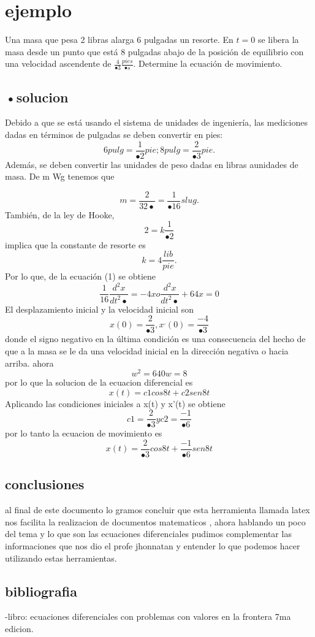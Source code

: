 \documentclass[12pt]{book}
\begin{document}
\section{ejemplo}
Una masa que pesa 2 libras alarga 6 pulgadas un resorte. En $t = 0$ se libera la masa desde un punto que está 8 pulgadas abajo de la posición de equilibrio con una velocidad ascendente de $\frac{4}{•3} \frac{pies}{•s}$. Determine la ecuación de movimiento.

\subsection{•solucion} 
 Debido a que se está usando el sistema de unidades de ingeniería, las mediciones dadas en términos de pulgadas se deben convertir en pies:
\[ 6 pulg = \frac{1}{•2} pie ; 8 pulg =  \frac{2}{•3} pie.
 \]
 Además, se deben convertir las unidades de peso dadas en libras aunidades de masa.
  De m  Wg tenemos que 
  
 \[ m= \frac{2}{32•} =\frac{1}{•16} slug.
  \] 
   También, de la ley de Hooke,
   \[ 2= k \frac{1}{•2} 
   \] implica que la constante de resorte es \[k = 4 \frac{lib}{pie}.
   \] Por lo que, de la ecuación (1) se obtiene
  \[ \frac{1}{16} \frac{d^{2}x}{dt^{2}•}= -4x o \frac{d^{2}x}{dt^{2}•} + 64x = 0
  \]
El desplazamiento inicial y la velocidad inicial son
\[ x(0)=\frac{2}{•3},x^{,}(0)=\frac{-4}{•3} 
  \]donde el signo negativo en la última condición es una consecuencia del hecho de que a la masa 
se le da una velocidad inicial en la dirección negativa o hacia arriba.
ahora
 \[ w^{2}= 64 0  w= 8
 \]
  por lo que la solucion de la ecuacion diferencial es 
\[x(t)= c1 cos8t + c2 sen8t   
\]
Aplicando las condiciones iniciales a x(t) y x'(t) se obtiene 
\[c1= \frac{2}{•3} y c2= \frac{-1}{•6}
 \]
por lo tanto la ecuacion de movimiento es
 \[x(t)= \frac{2}{•3} cos8t + \frac{-1}{•6} sen8t\]
 
 
 
 
 
\begin{center}
\subsection{conclusiones}
al final de este documento lo gramos concluir que esta herramienta llamada latex nos facilita la realizacion de documentos matematicos , ahora hablando un poco del tema y lo que son las ecuaciones diferenciales pudimos complementar las informaciones que nos dio el profe jhonnatan y entender lo que podemos hacer utilizando estas herramientas.

\subsection{bibliografia}
-libro: ecuaciones diferenciales con problemas con valores en la frontera 7ma edicion.

\end{center}
\end{document}
